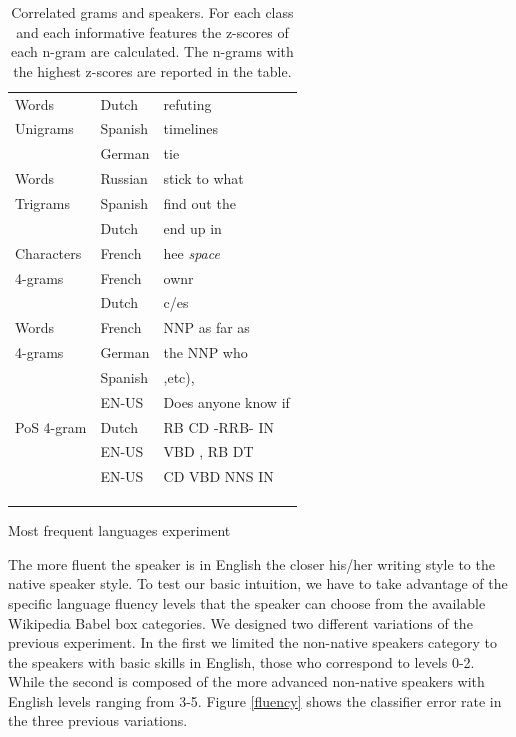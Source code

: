 \documentclass[10pt,a5paper,twoside]{article}
\begin{document}
\begin{table}[t]
\begin{subtable}[]{0.5\textwidth}
\begin{tabular}{l|ll}
   Words &Dutch& refuting\\
      Unigrams&Spanish&timelines\\
       &German& tie\\\hline

   Words&Russian& stick to what\\
   Trigrams&Spanish& find out the\\
   &Dutch& end up in\\\hline

   Characters &French& hee \emph{space}\\
   4-grams      &French&ownr\\
&Dutch&c/es\\
   \hline
   Words &French& NNP as far as\\
   4-grams &German& the NNP who\\
   &Spanish& ,etc),\\
   &EN-US& Does anyone know if\\\hline
   PoS 4-gram &Dutch& RB CD -RRB- IN \\
   &EN-US& VBD , RB DT\\
   &EN-US& CD VBD NNS IN\\
   && \\
   && \\
   && \\
   \end{tabular}
   \label{table:frequent}
   \caption{Most frequent languages experiment}
   \end{subtable}
\caption{Correlated grams and speakers. For each class and each informative
features the z-scores of each n-gram are calculated. The n-grams with the
highest z-scores are reported in the table.}
\end{table}

The more fluent the speaker is in English the closer his/her writing
style to the native speaker style. To test our basic intuition,
we have to take advantage of the specific language fluency levels that the speaker can choose
from the available Wikipedia Babel box categories. We designed two different
variations of the previous experiment. In the first we limited
the non-native speakers category to the speakers with basic skills in English,
those who correspond to levels 0-2.
While the second is composed of the more advanced non-native speakers with
English levels ranging from 3-5.
Figure \ref{fluency} shows the classifier error rate in the three previous
variations.
\end{document}
